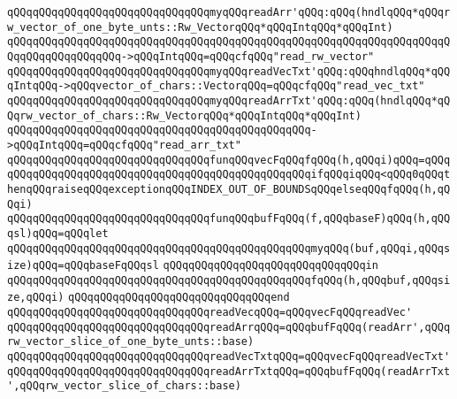 \verb|qQQqqQQqqQQqqQQqqQQqqQQqqQQqqQQqmyqQQqreadArr'qQQq:qQQq(hndlqQQq*qQQqrw_vector_of_one_byte_unts::Rw_VectorqQQq*qQQqIntqQQq*qQQqInt)|\newline
\verb|qQQqqQQqqQQqqQQqqQQqqQQqqQQqqQQqqQQqqQQqqQQqqQQqqQQqqQQqqQQqqQQqqQQqqQQqqQQqqQQqqQQqqQQq->qQQqIntqQQq=qQQqcfqQQq"read_rw_vector"|\newline
\newline
\verb|qQQqqQQqqQQqqQQqqQQqqQQqqQQqqQQqmyqQQqreadVecTxt'qQQq:qQQqhndlqQQq*qQQqIntqQQq->qQQqvector_of_chars::VectorqQQq=qQQqcfqQQq"read_vec_txt"|\newline
\verb|qQQqqQQqqQQqqQQqqQQqqQQqqQQqqQQqmyqQQqreadArrTxt'qQQq:qQQq(hndlqQQq*qQQqrw_vector_of_chars::Rw_VectorqQQq*qQQqIntqQQq*qQQqInt)|\newline
\verb|qQQqqQQqqQQqqQQqqQQqqQQqqQQqqQQqqQQqqQQqqQQqqQQq->qQQqIntqQQq=qQQqcfqQQq"read_arr_txt"|\newline
\newline
\verb|qQQqqQQqqQQqqQQqqQQqqQQqqQQqqQQqfunqQQqvecFqQQqfqQQq(h,qQQqi)qQQq=qQQq|\newline
\verb|qQQqqQQqqQQqqQQqqQQqqQQqqQQqqQQqqQQqqQQqqQQqqQQqifqQQqiqQQq<qQQq0qQQqthenqQQqraiseqQQqexceptionqQQqINDEX_OUT_OF_BOUNDSqQQqelseqQQqfqQQq(h,qQQqi)|\newline
\newline
\verb|qQQqqQQqqQQqqQQqqQQqqQQqqQQqqQQqfunqQQqbufFqQQq(f,qQQqbaseF)qQQq(h,qQQqsl)qQQq=qQQqlet|\newline
\verb|qQQqqQQqqQQqqQQqqQQqqQQqqQQqqQQqqQQqqQQqqQQqqQQqmyqQQq(buf,qQQqi,qQQqsize)qQQq=qQQqbaseFqQQqsl|\newline
\verb|qQQqqQQqqQQqqQQqqQQqqQQqqQQqqQQqin|\newline
\verb|qQQqqQQqqQQqqQQqqQQqqQQqqQQqqQQqqQQqqQQqqQQqqQQqfqQQq(h,qQQqbuf,qQQqsize,qQQqi)|\newline
\verb|qQQqqQQqqQQqqQQqqQQqqQQqqQQqqQQqend|\newline
\newline
\verb|qQQqqQQqqQQqqQQqqQQqqQQqqQQqqQQqreadVecqQQq=qQQqvecFqQQqreadVec'|\newline
\verb|qQQqqQQqqQQqqQQqqQQqqQQqqQQqqQQqreadArrqQQq=qQQqbufFqQQq(readArr',qQQqrw_vector_slice_of_one_byte_unts::base)|\newline
\verb|qQQqqQQqqQQqqQQqqQQqqQQqqQQqqQQqreadVecTxtqQQq=qQQqvecFqQQqreadVecTxt'|\newline
\verb|qQQqqQQqqQQqqQQqqQQqqQQqqQQqqQQqreadArrTxtqQQq=qQQqbufFqQQq(readArrTxt',qQQqrw_vector_slice_of_chars::base)|\newline
\newline

